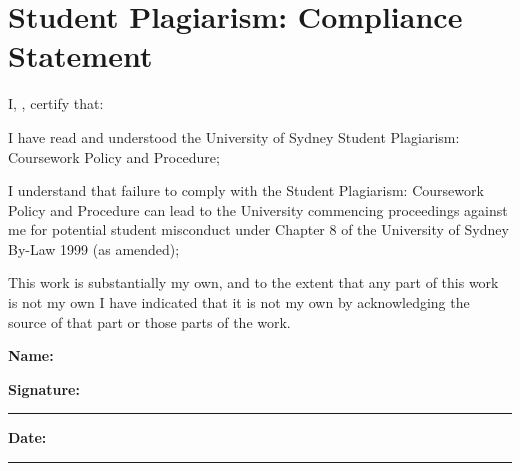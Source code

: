 \chapter*{Student Plagiarism: Compliance Statement}
\label{sec:plagiarism}

I, \thesisauthor, certify that:

I have read and understood the University of Sydney Student Plagiarism:
Coursework Policy and Procedure;

I understand that failure to comply with the Student Plagiarism: Coursework
Policy and Procedure can lead to the University commencing proceedings
against me for potential student misconduct under Chapter 8 of the
University of Sydney By-Law 1999 (as amended);

This work is substantially my own, and to the extent that any part of this
work is not my own I have indicated that it is not my own by acknowledging
the source of that part or those parts of the work.

\vspace{25mm}
\textbf{Name:} \thesisauthor

\vspace{8mm}
\textbf{Signature:} \rule{55mm}{0.4pt}\hfill
\textbf{Date:} \rule{35mm}{0.4pt}
